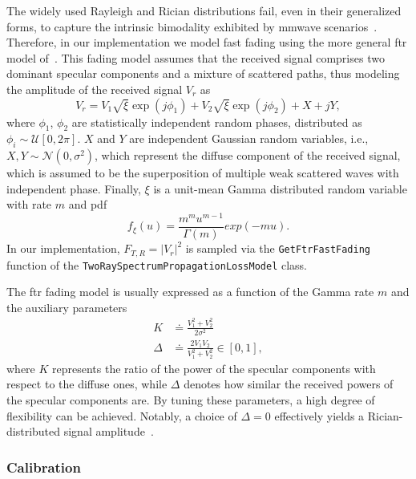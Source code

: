 The widely used Rayleigh and Rician distributions fail, even in their generalized forms, to capture the intrinsic bimodality exhibited by \gls{mmwave} scenarios~\cite{yacoub2007kappa, cotton2014human, mavridis2015near}.
Therefore, in our implementation we model fast fading using the more general \gls{ftr} model of~\cite{7917287}. %
This fading model assumes that the received signal comprises two dominant specular components and a mixture of scattered paths, thus modeling the amplitude of the received signal $V_r$ as
\begin{equation}
   V_r = V_1 \sqrt{\xi} \exp(j \phi_1) + V_2 \sqrt{\xi} \exp(j \phi_2) + X + jY,
\end{equation}
where $\phi_1$, $\phi_2$ are statistically independent random phases, distributed as  $\phi_{i} \sim \mathcal{U} \left[ 0, 2\pi\right]$. $X$ and $Y$ are independent Gaussian random variables, i.e., $X, Y \sim \mathcal{N} (0, \sigma^2)$, which represent the diffuse component of the received signal, which is assumed to be the superposition of multiple weak scattered waves with independent phase. Finally, $\xi$ is a unit-mean Gamma distributed random variable with rate $m$ and \gls{pdf}
\begin{equation}
   f_{\xi} (u) = \frac{m^m u^{m-1}}{\Gamma (m)} exp(-m u).
\end{equation}
In our implementation, $F_{T, R} = \left| V_r \right|^2$ is sampled via the \texttt{Get\-Ftr\-Fast\-Fading} function of the \texttt{Two\-Ray\-Spectrum\-Propagation\-Loss\-Model} class.

The \gls{ftr} fading model is usually expressed as a function of the Gamma rate $m$ and the auxiliary parameters
\begin{align}
    K &\doteq \frac{V_1^2 + V_2^2}{2 \sigma^2} \\
    \Delta &\doteq \frac{2 V_1 V_2}{V_1^2 + V_2^2} \in \left[ 0, 1 \right],
\end{align}
where $K$ represents the ratio of the power of the specular components with respect to the diffuse ones, while $\Delta$ denotes how similar the received powers of the specular components are. By tuning these parameters, a high degree of flexibility can be achieved. Notably, a choice of $\Delta = 0$ effectively yields a Rician-distributed signal amplitude~\cite{7917287}.

\subsubsection{Calibration}

